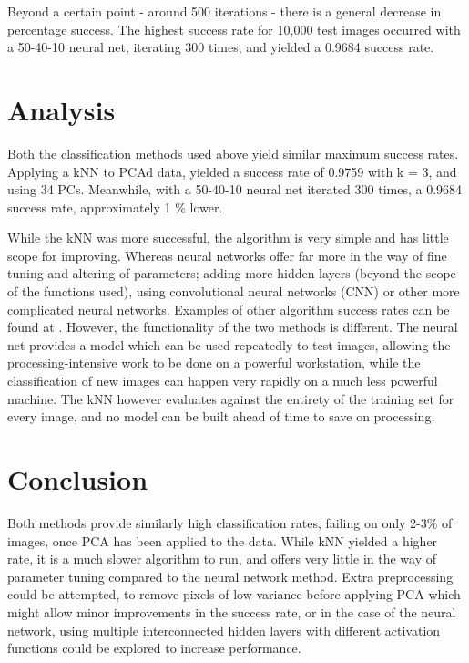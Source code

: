 \documentclass[11pt]{article} %
\begin{document}
Beyond a certain point - around 500 iterations - there is a general decrease in percentage success. The highest success rate for 10,000 test images occurred with a 50-40-10 neural net, iterating 300 times, and yielded a 0.9684 success rate.


\section{Analysis}

Both the classification methods used above yield similar maximum success rates. Applying a kNN to PCAd data, yielded a success rate of 0.9759 with k = 3, and using 34 PCs. Meanwhile, with a 50-40-10 neural net iterated 300 times, a 0.9684 success rate, approximately 1 \% lower. 

While the kNN was more successful, the algorithm is very simple and has little scope for improving. Whereas neural networks offer far more in the way of fine tuning and altering of parameters; adding more hidden layers (beyond the scope of the functions used), using convolutional neural networks (CNN) or other more complicated neural networks. Examples of other algorithm success rates can be found at \cite{mnist-website}. However, the functionality of the two methods is different. The neural net provides a model which can be used repeatedly to test images, allowing the processing-intensive work to be done on a powerful workstation, while the classification of new images can happen very rapidly on a much less powerful machine. The kNN however evaluates against the entirety of the training set for every image, and no model can be built ahead of time to save on processing. 

\section{Conclusion}

Both methods provide similarly high classification rates, failing on only 2-3\% of images, once PCA has been applied to the data. While kNN yielded a higher rate, it is a much slower algorithm to run, and offers very little in the way of parameter tuning compared to the neural network method. Extra preprocessing could be attempted, to remove pixels of low variance before applying PCA which might allow minor improvements in the success rate, or in the case of the neural network, using multiple interconnected hidden layers with different activation functions could be explored to increase performance. 
\end{document}
